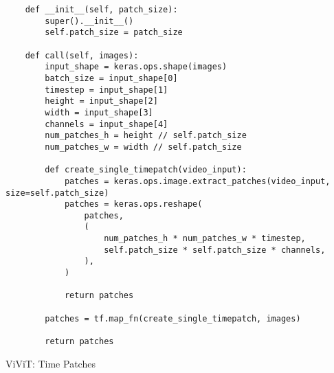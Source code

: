 \begin{listing}
    \begin{verbatim}
    def __init__(self, patch_size):
        super().__init__()
        self.patch_size = patch_size

    def call(self, images):
        input_shape = keras.ops.shape(images)
        batch_size = input_shape[0]
        timestep = input_shape[1]
        height = input_shape[2]
        width = input_shape[3]
        channels = input_shape[4]
        num_patches_h = height // self.patch_size
        num_patches_w = width // self.patch_size

        def create_single_timepatch(video_input):
            patches = keras.ops.image.extract_patches(video_input, size=self.patch_size)
            patches = keras.ops.reshape(
                patches,
                (
                    num_patches_h * num_patches_w * timestep,
                    self.patch_size * self.patch_size * channels,
                ),
            )

            return patches

        patches = tf.map_fn(create_single_timepatch, images)

        return patches

    \end{verbatim}
    \caption[time-patches]{ViViT: Time Patches}
    \label{code:timepatches}
\end{listing}


